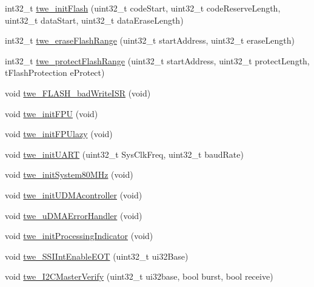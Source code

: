 \begin{DoxyCompactItemize}
\item 
int32\+\_\+t \hyperlink{group__tivaware__extension_gad27d12d3db25ab02cab49719679112ff}{twe\+\_\+init\+Flash} (uint32\+\_\+t code\+Start, uint32\+\_\+t code\+Reserve\+Length, uint32\+\_\+t data\+Start, uint32\+\_\+t data\+Erase\+Length)
\item 
int32\+\_\+t \hyperlink{group__tivaware__extension_ga3246fffb0d5a371dc0aca7cb2107d0a8}{twe\+\_\+erase\+Flash\+Range} (uint32\+\_\+t start\+Address, uint32\+\_\+t erase\+Length)
\item 
int32\+\_\+t \hyperlink{group__tivaware__extension_ga333907901d092e19fb725650ea54b7dc}{twe\+\_\+protect\+Flash\+Range} (uint32\+\_\+t start\+Address, uint32\+\_\+t protect\+Length, t\+Flash\+Protection e\+Protect)
\item 
void \hyperlink{group__tivaware__extension_ga18a2430e892002b301ba2372508f4248}{twe\+\_\+\+F\+L\+A\+S\+H\+\_\+bad\+Write\+I\+S\+R} (void)
\item 
void \hyperlink{group__tivaware__extension_ga47eb53d1a60d2924fe5e17bf3deb5152}{twe\+\_\+init\+F\+P\+U} (void)
\item 
void \hyperlink{group__tivaware__extension_ga861b56e4ce584719742baa7cb7e7bf40}{twe\+\_\+init\+F\+P\+Ulazy} (void)
\item 
void \hyperlink{group__tivaware__extension_ga6595fbba30948b76bb25dd132b927d24}{twe\+\_\+init\+U\+A\+R\+T} (uint32\+\_\+t Sys\+Clk\+Freq, uint32\+\_\+t baud\+Rate)
\item 
void \hyperlink{group__tivaware__extension_gac3d4a41e4cdbf8f1347467c6e6a4f4d9}{twe\+\_\+init\+System80\+M\+Hz} (void)
\item 
void \hyperlink{group__tivaware__extension_ga426827ec2d6bdc7dd6a7ddad17d4d919}{twe\+\_\+init\+U\+D\+M\+Acontroller} (void)
\item 
void \hyperlink{group__tivaware__extension_ga3f9ade243fdb9bb04c6b9c85d794cf65}{twe\+\_\+u\+D\+M\+A\+Error\+Handler} (void)
\item 
void \hyperlink{group__tivaware__extension_ga1862377c39a12ea09c946e22ee9e6853}{twe\+\_\+init\+Processing\+Indicator} (void)
\item 
void \hyperlink{group__tivaware__extension_gaa9b8fe7a3ca1dd437e493f91949168b0}{twe\+\_\+\+S\+S\+I\+Int\+Enable\+E\+O\+T} (uint32\+\_\+t ui32\+Base)
\item 
void \hyperlink{group__tivaware__extension_ga1a78bf5baccf03f8f27047a9738a49a7}{twe\+\_\+\+I2\+C\+Master\+Verify} (uint32\+\_\+t ui32base, bool burst, bool receive)
\end{DoxyCompactItemize}


